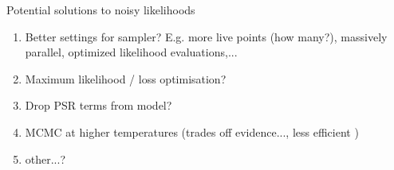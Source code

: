 \documentclass[10pt]{beamer}
\begin{document}
\begin{frame}{Potential solutions to noisy likelihoods}

	
	\begin{enumerate}
		\item Better settings for sampler? E.g. more live points (how many?), massively parallel, optimized likelihood evaluations,...
		\item Maximum likelihood / loss optimisation? 
		\item Drop PSR terms from model?
		\item MCMC at higher temperatures (trades off evidence..., less efficient	)
		\item other...?
	\end{enumerate}
	
	
\end{frame}











	
\end{document}
